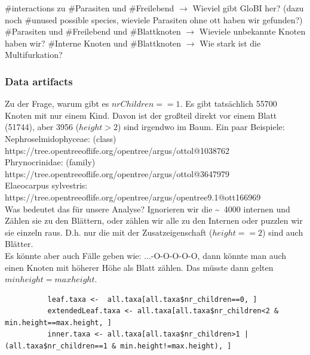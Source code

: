      \#interactions zu \#Parasiten und \#Freilebend $\rightarrow$ Wieviel gibt GloBI her? (dazu noch 
        \#unused possible species, wieviele Parasiten ohne ott haben wir gefunden?)
      \#Parasiten und \#Freilebend und \#Blattknoten $\rightarrow$ Wieviele unbekannte Knoten haben wir?
      \#Interne Knoten und \#Blattknoten $\rightarrow$ Wie stark ist die Multifurkation?
      \subsubsection{Data artifacts}
        Zu der Frage, warum gibt es $nrChildren==1$. Es gibt tatsächlich 55700 Knoten mit nur einem Kind. 
          Davon ist der großteil direkt vor einem Blatt (51744), aber 3956 ($height >2$) sind irgendwo im 
          Baum. Ein paar Beispiele: \\
        Nephroselmidophyceae: (class) \\
        https://tree.opentreeoflife.org/opentree/argus/ottol@1038762 \\
        Phrynocrinidae: (family) \\
        https://tree.opentreeoflife.org/opentree/argus/ottol@3647979 \\
        Elaeocarpus sylvestris: \\
        https://tree.opentreeoflife.org/opentree/argus/opentree9.1@ott166969 \\
        Was bedeutet das für unsere Analyse? Ignorieren wir die \~~4000 internen und Zählen sie zu den 
          Blättern, oder zählen wir alle zu den Internen oder puzzlen wir sie einzeln raus. D.h. nur die 
          mit der Zusatzeigenschaft ($height == 2$) sind auch Blätter. \\
        Es könnte aber auch Fälle geben wie: ...-O-O-O-O-O, dann könnte man auch einen Knoten mit höherer 
          Höhe als Blatt zählen. Das müsste dann gelten $min height = max height$. \\ 
        \begin{lstlisting}
          leaf.taxa <-  all.taxa[all.taxa$nr_children==0, ]
          extendedLeaf.taxa <- all.taxa[all.taxa$nr_children<2 & min.height==max.height, ]
          inner.taxa <- all.taxa[all.taxa$nr_children>1 | (all.taxa$nr_children==1 & min.height!=max.height), ]
        \end{lstlisting}

